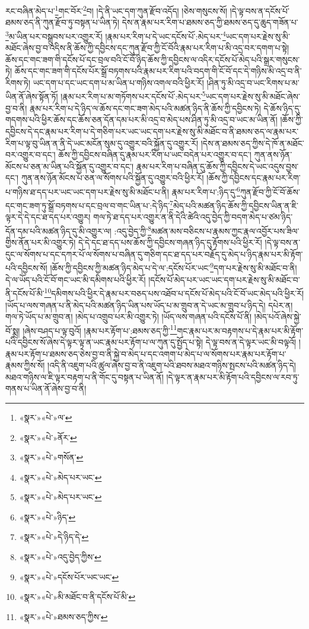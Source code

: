 རང་བཞིན་མེད་པ་\footnote{«སྣར་»«པེ་»ལ་}གང་བོར་\footnote{«སྣར་»«པེ་»ནོར་}བ། །དེ་ནི་ཡང་དག་ཀུན་རྫོབ་འདོད། །ཅེས་གསུངས་སོ། །དེ་ལྟ་བས་ན་དངོས་པོ་ཐམས་ཅད་ནི་ཀུན་རྫོབ་ཏུ་བསྟན་པ་ཡིན་ཏེ། དེས་ན་རྣམ་པར་རིག་པ་ཐམས་ཅད་ཀྱི་ཐམས་ཅད་དུ་ཆུད་གཟོན་པ་\footnote{«སྣར་»«པེ་»གསོན་}མ་ཡིན་པར་བསྒྲུབས་པར་འགྱུར་རོ། །རྣམ་པར་རིག་པ་དེ་ཡང་དངོས་པོ་:མེད་པར་\footnote{«སྣར་»«པེ་»མེད་པར་ཡང་}ཡང་དག་པར་རྗེས་སུ་མི་མཐོང་ཞེས་བྱ་བ་འདིས་ནི་ཆོས་ཀྱི་དབྱིངས་དང་ཀུན་རྫོབ་ཀྱི་ངོ་བོའི་རྣམ་པར་རིག་པ་མི་འདྲ་བར་དགག་པ་སྟེ། ཆོས་དང་གང་ཟག་གི་དངོས་པོ་དང་བྲལ་བའི་ངོ་བོ་ཉིད་ཆོས་ཀྱི་དབྱིངས་ལ་འདིར་དངོས་པོ་མེད་པའི་སྒྲར་གསུངས་ཏེ། ཆོས་དང་གང་ཟག་གི་དངོས་པོར་སྒྲོ་བཏགས་པའི་རྣམ་པར་རིག་པའི་བདག་གི་ངོ་བོ་དང་དེ་གཉིས་མི་འདྲ་བ་ནི་རིགས་ཏེ། ཡང་དག་པ་དང་ཡང་དག་པ་མ་ཡིན་པ་གཉིས་འགལ་བའི་ཕྱིར་རོ། །ཤིན་ཏུ་མི་འདྲ་བ་ཡང་རིགས་པ་མ་ཡིན་ནོ་ཞེས་སྟོན་ཏོ། །རྣམ་པར་རིག་པ་མ་གཏོགས་པར་དངོས་པོ་:མེད་པར་\footnote{«སྣར་»«པེ་»མེད་པར་ཡང་}ཡང་དག་པར་རྗེས་སུ་མི་མཐོང་ཞེས་བྱ་བ་ནི། རྣམ་པར་རིག་པ་དེ་ཉིད་ལ་ཆོས་དང་གང་ཟག་མེད་པའི་མཚན་ཉིད་ནི་ཆོས་ཀྱི་དབྱིངས་ཏེ། དེ་ཆོས་ཉིད་དུ་གདགས་པའི་ཕྱིར་ཆོས་དང་ཆོས་ཅན་དོན་དམ་པར་མི་འདྲ་བ་མེད་པས་ཤིན་ཏུ་མི་འདྲ་བ་ཡང་མ་ཡིན་ནོ། །ཆོས་ཀྱི་དབྱིངས་དེ་དང་རྣམ་པར་རིག་པ་དེ་གཅིག་པར་ཡང་ཡང་དག་པར་རྗེས་སུ་མི་མཐོང་བ་ནི་ཐམས་ཅད་ལ་རྣམ་པར་རིག་པ་ལྟ་བུ་ཡིན་ན་ནི་དེ་ཡང་མངོན་སུམ་དུ་འགྱུར་བའི་སྐྱོན་དུ་འགྱུར་རོ། །དེས་ན་ཐམས་ཅད་ཀྱིས་དེ་ཁོ་ན་མཐོང་བར་འགྱུར་བ་དང་། ཆོས་ཀྱི་དབྱིངས་བཞིན་དུ་རྣམ་པར་རིག་པ་ཡང་བདེན་པར་འགྱུར་བ་དང་། ཀུན་ནས་ཉོན་མོངས་པ་ཅན་མ་ཡིན་པའི་སྐྱོན་དུ་འགྱུར་བ་དང་། རྣམ་པར་རིག་པ་བཞིན་དུ་ཆོས་ཀྱི་དབྱིངས་དེ་ཡང་འདུས་བྱས་དང་། ཀུན་ནས་ཉོན་མོངས་པ་ཅན་ལ་སོགས་པའི་སྐྱོན་དུ་འགྱུར་བའི་ཕྱིར་རོ། །ཆོས་ཀྱི་དབྱིངས་དང་རྣམ་པར་རིག་པ་གཉིས་ཐ་དད་པར་ཡང་ཡང་དག་པར་རྗེས་སུ་མི་མཐོང་པ་ནི། རྣམ་པར་རིག་པ་:ཉིད་དུ་\footnote{«སྣར་»«པེ་»ཉིད་}ཀུན་རྫོབ་ཀྱི་ངོ་བོ་ཆོས་དང་གང་ཟག་ཏུ་སྒྲོ་བཏགས་པ་དང་བྲལ་བ་གང་ཡིན་པ་:དེ་ཉིད་\footnote{«སྣར་»«པེ་»དེ་ཉིད་དེ་}མེད་པའི་མཚན་ཉིད་ཆོས་ཀྱི་དབྱིངས་ཡིན་ན་ཇི་ལྟར་དེ་དེ་དང་ཐ་དད་པར་འགྱུར། གལ་ཏེ་ཐ་དད་པར་འགྱུར་ན་ནི་དེའི་ཚེའི་འདུ་བྱེད་ཀྱི་བདག་མེད་པ་ཙམ་ཉིད་དོན་དམ་པའི་མཚན་ཉིད་དུ་མི་འགྱུར་ལ། :འདུ་བྱེད་ཀྱི་\footnote{«སྣར་»«པེ་»འདུ་བྱེད་ཀྱིས་}མཚན་མས་བཅིངས་པ་རྣམས་ཀྱང་རྣལ་འབྱོར་པས་ཟིལ་གྱིས་ནོན་པར་མི་འགྱུར་ཏེ། དེ་དེ་དང་ཐ་དད་པས་ཆོས་ཀྱི་དབྱིངས་གཞན་ཉིད་དུ་རྟོགས་པའི་ཕྱིར་རོ། །དེ་ལྟ་བས་ན་དུང་ལ་སོགས་པ་དང་དཀར་པོ་ལ་སོགས་པ་བཞིན་དུ་གཅིག་དང་ཐ་དད་པར་བརྗོད་དུ་མེད་པ་ཉིད་རྣམ་པར་མི་རྟོག་པའི་དབྱིངས་སོ། །ཆོས་ཀྱི་དབྱིངས་ཀྱི་མཚན་ཉིད་མེད་པ་དེ་ལ་:དངོས་པོར་ཡང་\footnote{«སྣར་»«པེ་»དངོས་པོར་ཡང་ཡང་}དག་པར་རྗེས་སུ་མི་མཐོང་བ་ནི། དེ་ལ་ཡོད་པའི་ངོ་བོ་གང་ཡང་མི་དམིགས་པའི་ཕྱིར་རོ། །དངོས་པོ་མེད་པར་ཡང་ཡང་དག་པར་རྗེས་སུ་མི་མཐོང་བ་ནི་དངོས་པོ་མི་\footnote{«སྣར་»«པེ་»མི་མཐོང་བ་ནི་དངོས་པོ་མི་}དམིགས་པའི་ཕྱིར་དེ་རྣམ་པར་བཅད་པས་འཐོབ་པ་དངོས་པོ་མེད་པའི་ངོ་བོ་ཡང་མེད་པའི་ཕྱིར་རོ། །ཡོད་པ་ལས་གཞན་པ་ནི་མེད་པའི་མཚན་ཉིད་ཡིན་པས་ཡོད་པ་མ་གྲུབ་ན་དེ་ཡང་མ་གྲུབ་པ་ཉིད་དེ། དཔེར་ན། གལ་ཏེ་ཡོད་པ་མ་གྲུབ་ན། །མེད་པ་འགྲུབ་པར་མི་འགྱུར་ཏེ། །ཡོད་ལས་གཞན་པའི་དངོས་པོ་ནི། །མེད་པའོ་ཞེས་སྐྱེ་བོ་སྨྲ། །ཞེས་བཤད་པ་ལྟ་བུའོ། །རྣམ་པར་རྟོག་པ་:ཐམས་ཅད་ཀྱི་\footnote{«སྣར་»«པེ་»ཐམས་ཅད་ཀྱིས་}གང་རྣམ་པར་མ་བརྟགས་པ་དེ་རྣམ་པར་མི་རྟོག་པའི་དབྱིངས་སོ་ཞེས་དེ་ལྟར་ལྟ་ན་ཡང་རྣམ་པར་རྟོག་པ་ལ་ཀུན་དུ་སྤྱོད་པ་སྟེ། དེ་ལྟ་བས་ན་དེ་ལྟར་ཡང་མི་བལྟའོ། །རྣམ་པར་རྟོག་པ་ཐམས་ཅད་ཅེས་བྱ་བ་ནི་སྐྱེ་བ་མེད་པ་དང་འགག་པ་མེད་པ་ལ་སོགས་པར་རྣམ་པར་རྟོག་པ་རྣམས་ཀྱིས་སོ། །འདི་ནི་འཇུག་པའི་ཚུལ་ཞེས་བྱ་བ་ནི་འཇུག་པའི་ཐབས་མཐའ་གཉིས་སྤངས་པའི་མཚན་ཉིད་དེ། མཐའ་གཉིས་ལ་ཇི་ལྟར་བརྟག་པ་ནི་གོང་དུ་བསྟན་པ་ཡིན་ནོ། །དེ་ལྟར་ན་རྣམ་པར་མི་རྟོག་པའི་དབྱིངས་ལ་རབ་ཏུ་གནས་པ་ཡིན་ནོ་ཞེས་བྱ་བ་ནི། 